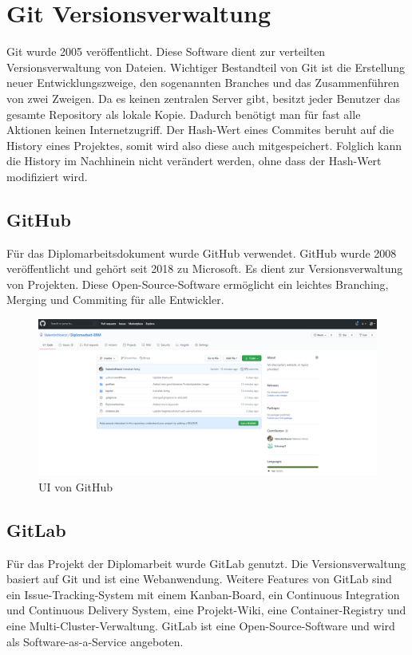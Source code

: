 \section{Git Versionsverwaltung}
Git wurde 2005 veröffentlicht. Diese Software dient zur verteilten Versionsverwaltung von Dateien. Wichtiger Bestandteil von Git ist die Erstellung neuer Entwicklungszweige, den sogenannten Branches und das Zusammenführen von zwei Zweigen. Da es keinen zentralen Server gibt, besitzt jeder Benutzer das gesamte Repository als lokale Kopie. Dadurch benötigt man für fast alle Aktionen keinen Internetzugriff. Der Hash-Wert eines Commites beruht auf die History eines Projektes, somit wird also diese auch mitgespeichert. Folglich kann die History im Nachhinein nicht verändert werden, ohne dass der Hash-Wert modifiziert wird. \autocite{wikiGit}

\subsection{GitHub}
Für das Diplomarbeitsdokument wurde GitHub verwendet. GitHub wurde 2008 veröffentlicht und gehört seit 2018 zu Microsoft. Es dient zur Versionsverwaltung von Projekten. Diese Open-Source-Software ermöglicht ein leichtes Branching, Merging und Commiting für alle Entwickler. \autocite{wikiGitHub}

\begin{figure}[H]
	\centerline{
		\includegraphics[width=1\textwidth, frame]{./grafiken/github_screen.png}
	}
	\vskip0pt
	\caption{UI von GitHub} \label{fig:github}
\end{figure}

\subsection{GitLab}
Für das Projekt der Diplomarbeit wurde GitLab genutzt. Die Versionsverwaltung basiert auf Git und ist eine Webanwendung. Weitere Features von GitLab sind ein Issue-Tracking-System mit einem Kanban-Board, ein Continuous Integration und Continuous Delivery System, eine Projekt-Wiki, eine Container-Registry und eine Multi-Cluster-Verwaltung. GitLab ist eine Open-Source-Software und wird als Software-as-a-Service angeboten. \autocite{wikiGitLab}

